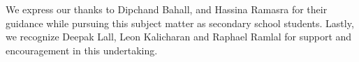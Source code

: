 We express our thanks to Dipchand Bahall, and Hassina Ramasra for their guidance while pursuing this subject matter as secondary school students. Lastly, we recognize Deepak Lall, Leon Kalicharan and Raphael Ramlal for support and encouragement in this undertaking.
